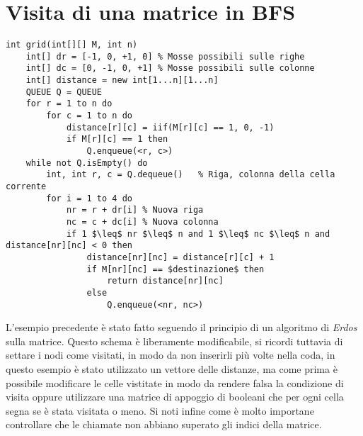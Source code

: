 \documentclass[../cheatSheetAlgoritmi.tex]{subfiles}
\begin{document}
\section{Visita di una matrice in BFS}
\begin{lstlisting}[caption=Schema BFS con Matrice quadra]
int grid(int[][] M, int n)
	int[] dr = [-1, 0, +1, 0] % Mosse possibili sulle righe
  	int[] dc = [0, -1, 0, +1] % Mosse possibili sulle colonne
  	int[] distance = new int[1...n][1...n]
  	QUEUE Q = QUEUE
  	for r = 1 to n do
    	for c = 1 to n do
      		distance[r][c] = iif(M[r][c] == 1, 0, -1)
      		if M[r][c] == 1 then
        		Q.enqueue(<r, c>)
  	while not Q.isEmpty() do
    	int, int r, c = Q.dequeue()   % Riga, colonna della cella corrente
    	for i = 1 to 4 do
      		nr = r + dr[i] % Nuova riga
      		nc = c + dc[i] % Nuova colonna
      		if 1 $\leq$ nr $\leq$ n and 1 $\leq$ nc $\leq$ n and distance[nr][nc] < 0 then
        		distance[nr][nc] = distance[r][c] + 1
        		if M[nr][nc] == $destinazione$ then
          			return distance[nr][nc]
        		else
          			Q.enqueue(<nr, nc>)
\end{lstlisting}
L'esempio precedente è stato fatto seguendo il principio di un algoritmo di \textit{Erdos} sulla matrice. Questo schema è liberamente modificabile, si ricordi tuttavia di settare i nodi come visitati, in modo da non inserirli più volte nella coda, in questo esempio è stato utilizzato un vettore delle distanze, ma come prima è possibile modificare le celle vistitate in modo da rendere falsa la condizione di visita oppure utilizzare una matrice di appoggio di booleani che per ogni cella segna se è stata visitata o meno. Si noti infine come è molto importane controllare che le chiamate non abbiano superato gli indici della matrice.

\newpage
\end{document}
